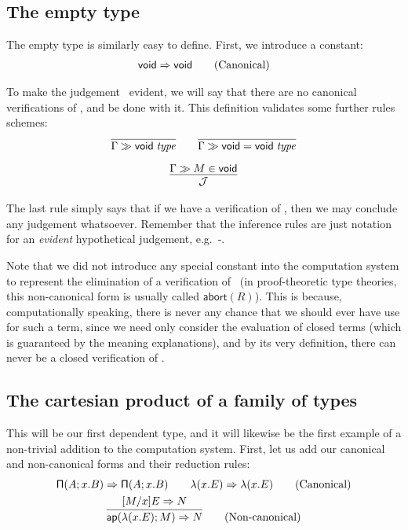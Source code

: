\documentclass[main.tex]{subfiles}
\begin{document}
\subsection{The empty type}

The empty type is similarly easy to define. First, we introduce a constant:
\begin{gather*}
  \mathsf{void}\Rightarrow\mathsf{void}\tag{Canonical}
\end{gather*}

To make the judgement \isset\tyvoid\ evident, we will say that there are no
canonical verifications of \tyvoid, and be done with it. This definition
validates some further rules schemes:
\begin{gather*}
  \infer{
    \sequent\Gamma\isset\tyvoid
  }{
  }\qquad
  \infer{
    \sequent\Gamma\isset{\tyvoid=\tyvoid}
  }{
  }\\[6pt]
  \infer{
    \mathcal{J}
  }{
    \sequent\Gamma\ver{M}{\tyvoid}
  }
\end{gather*}

The last rule simply says that if we have a verification of \tyvoid, then we
may conclude any judgement whatsoever. Remember that the inference rules are
just notation for an \emph{evident} hypothetical judgement, e.g.\
\hyp{}{\sequent\Gamma{}}.

Note that we did not introduce any special constant into the computation system
to represent the elimination of a verification of \tyvoid\ (in proof-theoretic
type theories, this non-canonical form is usually called $\mathsf{abort}(R)$).
This is because, computationally speaking, there is never any chance that we
should ever have use for such a term, since we need only consider the
evaluation of closed terms (which is guaranteed by the meaning explanations),
and by its very definition, there can never be a closed verification of
\tyvoid.

\subsection{The cartesian product of a family of types}

This will be our first dependent type, and it will likewise be the first
example of a non-trivial addition to the computation system. First, let us add
our canonical and non-canonical forms and their reduction rules:
\begin{gather*}
  \reduce{\typrod{A}{x}{B}}{\typrod{A}{x}{B}}
  \qquad
  \reduce{\lam{x}{E}}{\lam{x}{E}}
  \tag{Canonical}\\
  \infer{
    \reduce{\ap{\lam{x}{E}}{M}}{N}
  }{
    \reduce{[M/x]E}{N}
  }\tag{Non-canonical}
\end{gather*}
\end{document}
